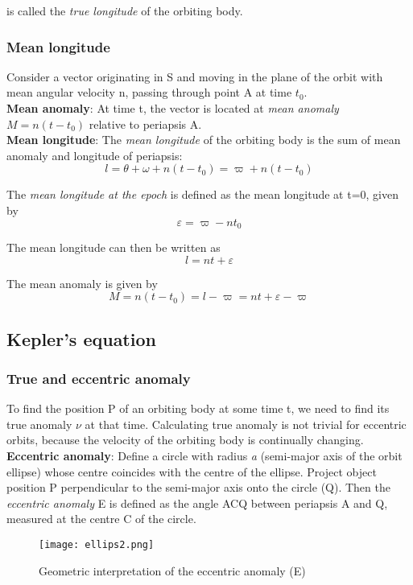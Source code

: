 \documentclass[Orbiter Developer Manual.tex]{subfiles}
\begin{document}
\noindent
is called the \textit{true longitude} of the orbiting body.


\subsubsection{Mean longitude}
Consider a vector originating in S and moving in the plane of the orbit with mean angular velocity n, passing through point A at time $t_{0}$.\\
\textbf{Mean anomaly}: At time t, the vector is located at \textit{mean anomaly} $ M = n(t-t_0) $ relative to periapsis A.\\
\textbf{Mean longitude}: The \textit{mean longitude} of the orbiting body is the sum of mean anomaly and longitude of periapsis:
\[ l = \theta + \omega + n(t-t_0) = \varpi + n(t-t_0) \]

\noindent
The \textit{mean longitude at the epoch} is defined as the mean longitude at t=0, given by
\[ \varepsilon = \varpi - nt_0 \]

\noindent
The mean longitude can then be written as
\[ l = nt + \varepsilon \]

\noindent
The mean anomaly is given by
\[ M = n(t-t_0) = l - \varpi = nt + \varepsilon - \varpi \]


\subsection{Kepler's equation}
\subsubsection{True and eccentric anomaly}
To find the position P of an orbiting body at some time t, we need to find its true anomaly $\nu$ at that time. Calculating true anomaly is not trivial for eccentric orbits, because the velocity of the orbiting body is continually changing.\\
\textbf{Eccentric anomaly}: Define a circle with radius \textit{a} (semi-major axis of the orbit ellipse) whose centre coincides with the centre of the ellipse.
Project object position P perpendicular to the semi-major axis onto the circle (Q). Then the \textit{eccentric anomaly} E is defined as the angle ACQ between periapsis A and Q, measured at the centre C of the circle.

\begin{figure}[H]
  \centering
  \texttt{[image: ellips2.png]}
  \caption{Geometric interpretation of the eccentric anomaly (E)}
\end{figure}
\end{document}
